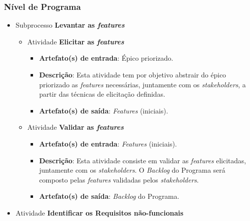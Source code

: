 
  \subsubsection{Nível de Programa}
    
    \begin{itemize}
	
     \item Subprocesso \textbf{Levantar as \textit{features}}
	
	\begin{itemize}
	  \item Atividade \textbf{Elicitar as \textit{features}}
	      
	      \begin{itemize}
		  \item \textbf{Artefato(s) de entrada}: Épico priorizado.
		  
		  \item \textbf{Descrição}: Esta atividade tem por objetivo abstrair do épico priorizado
		    as \textit{features} necessárias, juntamente com os \textit{stakeholders}, a partir das
		    técnicas de elicitação definidas.
		  
		  \item \textbf{Artefato(s) de saída}: \textit{Features} (iniciais).
		    
		\end{itemize}
	    
	    \item Atividade \textbf{Validar as \textit{features}}
	    
		\begin{itemize}
		  \item \textbf{Artefato(s) de entrada}: \textit{Features} (iniciais).
		  
		  \item \textbf{Descrição}: Esta atividade consiste em validar as \textit{features} elicitadas,
		    juntamente com os \textit{stakeholders}. O \textit{Backlog} do Programa será composto
		    pelas \textit{features} validadas pelos \textit{stakeholders}.
		  
		  \item \textbf{Artefato(s) de saída}: \textit{Backlog} do Programa.
			
		\end{itemize}
	\end{itemize} %
	      
     \item Atividade \textbf{Identificar os Requisitos não-funcionais}
      

\end{itemize}
